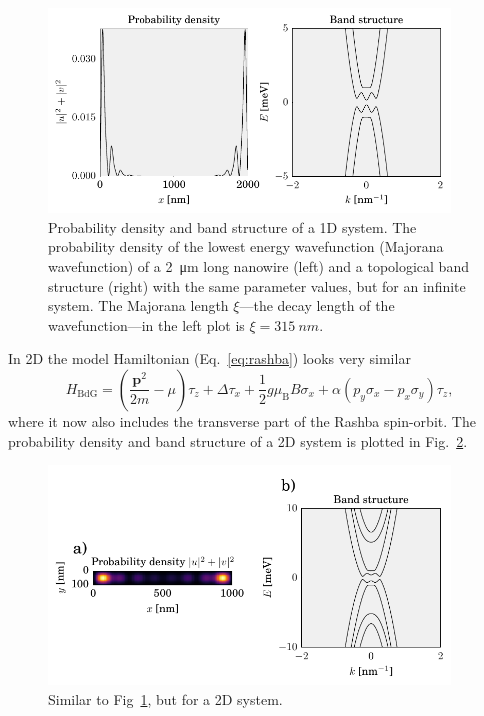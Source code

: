 \begin{figure}
\begin{centering}
\includegraphics[width=0.95\textwidth]{chapter_introduction/figures/wavefunction_1d.pdf}
\par\end{centering}
\caption{Probability density and band structure of a 1D system.
The probability density of the lowest energy wavefunction (Majorana wavefunction) of a \SI{2}{\micro\metre} long nanowire (left) and a topological band structure (right) with the same parameter values, but for an infinite system.
The Majorana length $\xi$---the decay length of the wavefunction---in
the left plot is $\xi=\SI{315}{nm}$.
\label{fig:wavefunction_1d}}
\end{figure}

In 2D the model Hamiltonian (Eq.~\ref{eq:rashba}) looks very similar
\begin{equation}
H_{\textrm{BdG}}=\left(\frac{\bm{p}^{2}}{2m}-\mu\right)\tau_{z}+\Delta\tau_{x}+\frac{1}{2}g\mu_{\textrm{B}}B\sigma_{x}+\alpha\left(p_{y}\sigma_{x}-p_{x}\sigma_{y}\right)\tau_{z},\label{eq:2D_Ham}
\end{equation}
where it now also includes the transverse part of the Rashba spin-orbit.
The probability density and band structure of a 2D system is plotted in Fig.~\ref{fig:wavefunction_2d}.

\begin{figure}
\begin{centering}
\includegraphics[width=0.95\textwidth]{chapter_introduction/figures/wavefunction_2d.pdf}
\par\end{centering}
\caption{Similar to Fig~\ref{fig:wavefunction_1d}, but for a 2D system.
\label{fig:wavefunction_2d}}
\end{figure}


